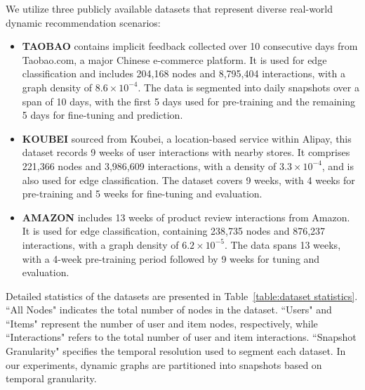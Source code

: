 \documentclass[letterpaper]{article} %
\begin{document}
\begin{table}[]
    \centering
    \caption{Statistics of the experimental datasets.}
    \label{table:dataset statistics}
\end{table}

We utilize three publicly available datasets that represent diverse real-world dynamic recommendation scenarios:
\begin{itemize}[leftmargin=*]
\item\textbf{TAOBAO } contains implicit feedback collected over 10 consecutive days from Taobao.com, a major Chinese e-commerce platform. It is used for edge classification and includes 204,168 nodes and 8,795,404 interactions, with a graph density of $8.6 \times 10^{-4}$. The data is segmented into daily snapshots over a span of 10 days, with the first 5 days used for pre-training and the remaining 5 days for fine-tuning and prediction.
\item\textbf{KOUBEI } sourced from Koubei, a location-based service within Alipay, this dataset records 9 weeks of user interactions with nearby stores. It comprises 221,366 nodes and 3,986,609 interactions, with a density of $3.3 \times 10^{-4}$, and is also used for edge classification. The dataset covers 9 weeks, with 4 weeks for pre-training and 5 weeks for fine-tuning and evaluation.
\item\textbf{AMAZON } includes 13 weeks of product review interactions from Amazon. It is used for edge classification, containing 238,735 nodes and 876,237 interactions, with a graph density of $6.2 \times 10^{-5}$. The data spans 13 weeks, with a 4-week pre-training period followed by 9 weeks for tuning and evaluation.
\end{itemize}
Detailed statistics of the datasets are presented in Table~\ref{table:dataset statistics}. ``All Nodes" indicates the total number of nodes in the dataset. ``Users" and ``Items" represent the number of user and item nodes, respectively, while ``Interactions" refers to the total number of user and item interactions. ``Snapshot Granularity" specifies the temporal resolution used to segment each dataset. In our experiments, dynamic graphs are partitioned into snapshots based on temporal granularity.
\end{document}
